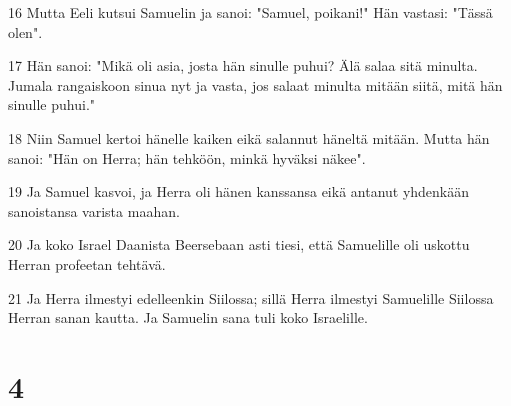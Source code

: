 \par 16 Mutta Eeli kutsui Samuelin ja sanoi: "Samuel, poikani!" Hän vastasi: "Tässä olen".
\par 17 Hän sanoi: "Mikä oli asia, josta hän sinulle puhui? Älä salaa sitä minulta. Jumala rangaiskoon sinua nyt ja vasta, jos salaat minulta mitään siitä, mitä hän sinulle puhui."
\par 18 Niin Samuel kertoi hänelle kaiken eikä salannut häneltä mitään. Mutta hän sanoi: "Hän on Herra; hän tehköön, minkä hyväksi näkee".
\par 19 Ja Samuel kasvoi, ja Herra oli hänen kanssansa eikä antanut yhdenkään sanoistansa varista maahan.
\par 20 Ja koko Israel Daanista Beersebaan asti tiesi, että Samuelille oli uskottu Herran profeetan tehtävä.
\par 21 Ja Herra ilmestyi edelleenkin Siilossa; sillä Herra ilmestyi Samuelille Siilossa Herran sanan kautta. Ja Samuelin sana tuli koko Israelille.

\chapter{4}

